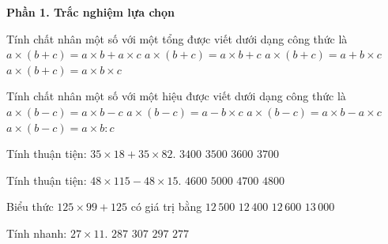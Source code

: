 \textbf{Phần 1. Trắc nghiệm lựa chọn}

\begin{ex} %
Tính chất nhân một số với một tổng được viết dưới dạng công thức là
\choice
{\True $a \times (b + c) = a \times b + a \times c$}
{$a \times (b + c) = a \times b + c$}
{$a \times (b + c) = a + b \times c$}
{$a \times (b + c) = a \times b \times c$}
\end{ex}

\begin{ex} %
Tính chất nhân một số với một hiệu được viết dưới dạng công thức là
\choice
{$a \times (b - c) = a \times b - c$}
{$a \times (b - c) = a - b \times c$}
{\True $a \times (b - c) = a \times b - a \times c$}
{$a \times (b - c) = a \times b : c$}
\end{ex}

\begin{ex} %
Tính thuận tiện: $35 \times 18 + 35 \times 82$.
\choice
{$3400$}
{\True $3500$}
{$3600$}
{$3700$}
\end{ex}

\begin{ex} %
Tính thuận tiện: $48 \times 115 - 48 \times 15$.
\choice
{$4600$}
{$5000$}
{$4700$}
{\True $4800$}
\end{ex}

\begin{ex} %
Biểu thức $125 \times 99 + 125$ có giá trị bằng
\choice
{\True $12\,500$}
{$12\,400$}
{$12\,600$}
{$13\,000$}
\end{ex}

\begin{ex} %
Tính nhanh: $27 \times 11$.
\choice
{$287$}
{$307$}
{\True $297$}
{$277$}
\end{ex}


